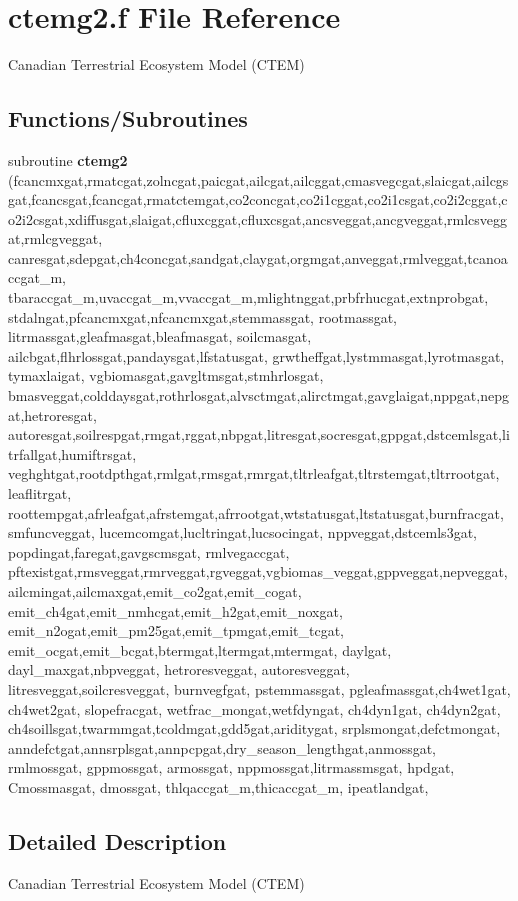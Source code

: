 \hypertarget{ctemg2_8f}{}\section{ctemg2.\+f File Reference}
\label{ctemg2_8f}


Canadian Terrestrial Ecosystem Model (C\+T\+E\+M)  


\subsection*{Functions/\+Subroutines}
\begin{DoxyCompactItemize}
\item 
\hypertarget{ctemg2_8f_aad9339a6184b1b249578ee2bafc717ed}{}subroutine {\bfseries ctemg2} (fcancmxgat,rmatcgat,zolncgat,paicgat,ailcgat,ailcggat,cmasvegcgat,slaicgat,ailcgsgat,fcancsgat,fcancgat,rmatctemgat,co2concgat,co2i1cggat,co2i1csgat,co2i2cggat,co2i2csgat,xdiffusgat,slaigat,cfluxcggat,cfluxcsgat,ancsveggat,ancgveggat,rmlcsveggat,rmlcgveggat, canresgat,sdepgat,ch4concgat,sandgat,claygat,orgmgat,anveggat,rmlveggat,tcanoaccgat\+\_\+m, tbaraccgat\+\_\+m,uvaccgat\+\_\+m,vvaccgat\+\_\+m,mlightnggat,prbfrhucgat,extnprobgat, stdalngat,pfcancmxgat,nfcancmxgat,stemmassgat, rootmassgat, litrmassgat,gleafmasgat,bleafmasgat, soilcmasgat, ailcbgat,flhrlossgat,pandaysgat,lfstatusgat, grwtheffgat,lystmmasgat,lyrotmasgat, tymaxlaigat, vgbiomasgat,gavgltmsgat,stmhrlosgat, bmasveggat,colddaysgat,rothrlosgat,alvsctmgat,alirctmgat,gavglaigat,nppgat,nepgat,hetroresgat, autoresgat,soilrespgat,rmgat,rggat,nbpgat,litresgat,socresgat,gppgat,dstcemlsgat,litrfallgat,humiftrsgat, veghghtgat,rootdpthgat,rmlgat,rmsgat,rmrgat,tltrleafgat,tltrstemgat,tltrrootgat, leaflitrgat, roottempgat,afrleafgat,afrstemgat,afrrootgat,wtstatusgat,ltstatusgat,burnfracgat, smfuncveggat, lucemcomgat,lucltringat,lucsocingat, nppveggat,dstcemls3gat, popdingat,faregat,gavgscmsgat, rmlvegaccgat, pftexistgat,rmsveggat,rmrveggat,rgveggat,vgbiomas\+\_\+veggat,gppveggat,nepveggat,ailcmingat,ailcmaxgat,emit\+\_\+co2gat,emit\+\_\+cogat, emit\+\_\+ch4gat,emit\+\_\+nmhcgat,emit\+\_\+h2gat,emit\+\_\+noxgat, emit\+\_\+n2ogat,emit\+\_\+pm25gat,emit\+\_\+tpmgat,emit\+\_\+tcgat, emit\+\_\+ocgat,emit\+\_\+bcgat,btermgat,ltermgat,mtermgat, daylgat, dayl\+\_\+maxgat,nbpveggat, hetroresveggat, autoresveggat, litresveggat,soilcresveggat, burnvegfgat, pstemmassgat, pgleafmassgat,ch4wet1gat, ch4wet2gat, slopefracgat, wetfrac\+\_\+mongat,wetfdyngat, ch4dyn1gat, ch4dyn2gat, ch4soillsgat,twarmmgat,tcoldmgat,gdd5gat,ariditygat, srplsmongat,defctmongat, anndefctgat,annsrplsgat,annpcpgat,dry\+\_\+season\+\_\+lengthgat,anmossgat, rmlmossgat, gppmossgat, armossgat, nppmossgat,litrmassmsgat, hpdgat, Cmossmasgat, dmossgat, thlqaccgat\+\_\+m,thicaccgat\+\_\+m, ipeatlandgat,\label{ctemg2_8f_aad9339a6184b1b249578ee2bafc717ed}

\end{DoxyCompactItemize}


\subsection{Detailed Description}
Canadian Terrestrial Ecosystem Model (C\+T\+E\+M) 

